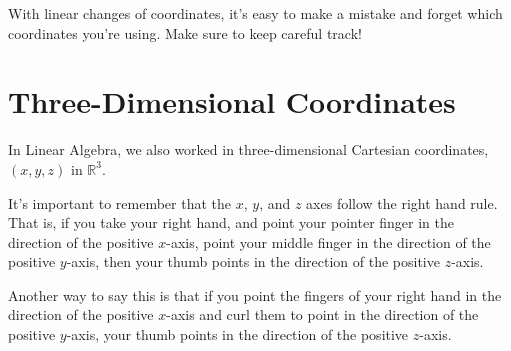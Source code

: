 \documentclass{ximera}
\begin{document}
With linear changes of coordinates, it's easy to make a mistake and forget which coordinates you're using. Make sure to keep careful track!

\section*{Three-Dimensional Coordinates}

In Linear Algebra, we also worked in three-dimensional Cartesian coordinates, $(x,y,z)$ in $\mathbb{R}^3$.

\begin{image}
\end{image}

It's important to remember that the $x$, $y$, and $z$ axes follow the right hand rule. That is, if you take your right hand, and point your pointer finger in the direction of the positive $x$-axis, point your middle finger in the direction of the positive $y$-axis, then your thumb points in the direction of the positive $z$-axis.

Another way to say this is that if you point the fingers of your right hand in the direction of the positive $x$-axis and curl them to point in the direction of the positive $y$-axis, your thumb points in the direction of the positive $z$-axis.
\end{document}
